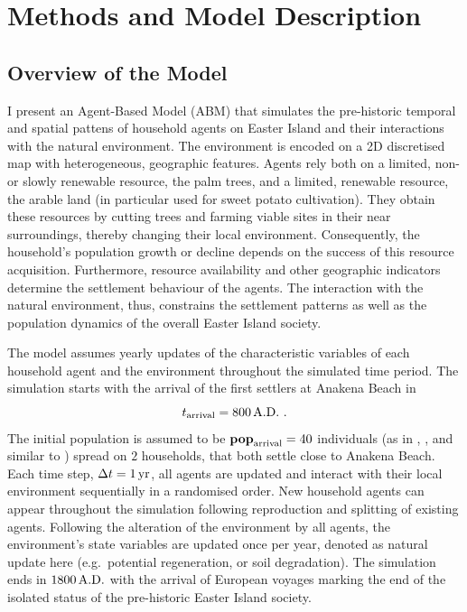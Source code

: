 \chapter{Methods and Model Description}\label{chapter:Methods}

\section{Overview of the Model}
I present an Agent-Based Model (ABM) that simulates the pre-historic temporal and spatial pattens of household agents on Easter Island and their interactions with the natural environment. 
The environment is encoded on a 2D discretised map with heterogeneous, geographic features.
Agents rely both on a limited, non- or slowly renewable resource, the palm trees, and a limited, renewable resource, the arable land (in particular used for sweet potato cultivation). 
They obtain these resources by cutting trees and farming viable sites in their near surroundings, thereby changing their local environment.
Consequently, the household's population growth or decline depends on the success of this resource acquisition. 
Furthermore, resource availability and other geographic indicators determine the settlement behaviour of the agents.
The interaction with the natural environment, thus, constrains the settlement patterns as well as the population dynamics of the overall Easter Island society.

The model assumes yearly updates of the characteristic variables of each household agent and the environment throughout the simulated time period.
The simulation starts with the arrival of the first settlers at Anakena Beach in
\begin{equation}
t_\text{arrival} = 800\, {\rm A.D.}\ .
\end{equation}
The initial population is assumed to be $\mathbf{pop}_{\rm arrival} = 40$ individuals (as in \citet{Good2006}, \citet{Brander1998}, and similar to \citet{Brandt2015}) spread on $2$ households, that both settle close to Anakena Beach.
Each time step, $\Delta t=1\,{\rm yr}$, all agents are updated and interact with their local environment sequentially in a randomised order. 
New household agents can appear throughout the simulation following reproduction and splitting of existing agents. 
Following the alteration of the environment by all agents, the environment's state variables are updated once per year, denoted as natural update here (e.g.\ potential regeneration, or soil degradation).
The simulation ends in $1800\, {\rm A.D.}$ with the arrival of European voyages marking the end of the isolated status of the pre-historic Easter Island society.%

